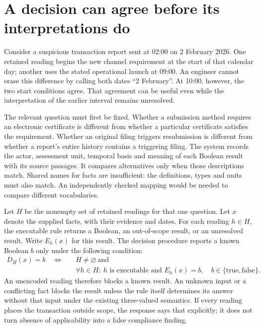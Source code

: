 
\section{A decision can agree before its interpretations do}
\label{sec:invariant-decisions}

Consider a suspicious transaction report sent at 02:00 on 2 February 2026.
One retained reading begins the new channel requirement at the start of that
calendar day; another uses the stated operational launch at 09:00. An engineer
cannot erase this difference by calling both dates ``2 February''. At 10:00,
however, the two start conditions agree. That agreement can be useful even
while the interpretation of the earlier interval remains unresolved.
\cite{sfcstr2026}

The relevant question must first be fixed. Whether a submission method requires
an electronic certificate is different from whether a particular certificate
satisfies the requirement. Whether an original filing triggers resubmission is
different from whether a report's entire history contains a triggering filing.
The system records the actor, assessment unit, temporal basis and meaning of
each Boolean result with its source passages. It compares alternatives only
when those descriptions match. Shared names for facts are insufficient: the
definitions, types and units must also match. An independently checked mapping
would be needed to compare different vocabularies.

Let $H$ be the nonempty set of retained readings for that one question. Let $x$
denote the supplied facts, with their evidence and dates. For each reading
$h\in H$, the executable rule returns a Boolean, an out-of-scope result, or an
unresolved result. Write $E_h(x)$ for this result. The decision procedure reports
a known Boolean $b$ only under the following condition:
\begin{equation}
  \begin{split}
    D_H(x)=b \quad\Longleftrightarrow\quad &H\ne\varnothing\ \text{and}\\
    &\forall h\in H:\ h\text{ is executable and }E_h(x)=b,
    \quad b\in\{\mathrm{true},\mathrm{false}\}.
  \end{split}
  \label{eq:retained-unanimity}
\end{equation}
An unencoded reading therefore blocks a known result. An unknown input or a
conflicting fact blocks the result unless the rule itself determines its answer
without that input under the existing three-valued semantics. If every reading
places the transaction outside scope, the response says that explicitly; it
does not turn absence of applicability into a false compliance finding.

